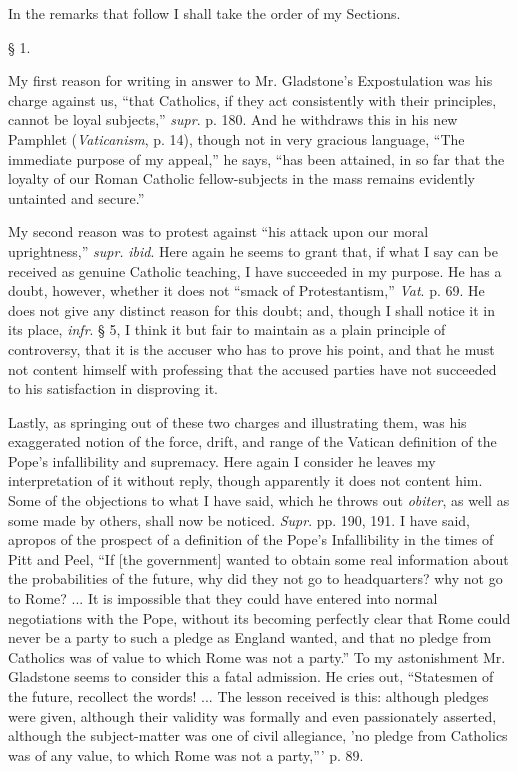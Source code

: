 In the remarks that follow I shall take the order of my Sections.

§ 1.

My first reason for writing in answer to Mr. Gladstone's
Expostulation was his charge against us, ``that Catholics, if they
act consistently with their principles, cannot be loyal subjects,'' \emph{supr}.
p. 180. And he withdraws this in his new Pamphlet (\emph{Vaticanism}, p.
14), though not in very gracious language, ``The immediate
purpose of my appeal,'' he says, ``has been attained, in so far
that the loyalty of our Roman Catholic fellow-subjects in the mass
remains evidently untainted and secure.''

My second reason was to protest against ``his attack upon our
moral uprightness,'' \emph{supr.} \emph{ibid}. Here again he seems
to grant that, if what I say can be received as genuine Catholic
teaching, I have succeeded in my purpose. He has a doubt, however,
whether it does not ``smack of Protestantism,'' \emph{Vat}. p.
69. He does not give any distinct reason for this doubt; and, though I
shall notice it in its place, \emph{infr}. § 5, I think it but fair to
maintain as a plain principle of controversy, that it is the accuser who
has to prove his point, and that he must not content himself with
professing that the accused parties have not succeeded to his
satisfaction in disproving it.

Lastly, as springing out of these two charges and illustrating them,
was his exaggerated notion of the force, drift, and range of the Vatican
definition of the Pope's infallibility and supremacy. Here again I
consider he leaves my interpretation of it without reply, though
apparently it does not content him. Some of the objections to what I
have said, which he throws out \emph{obiter}, as well as some made by
others, shall now be noticed.
\emph{Supr}. pp. 190, 191. I have said, apropos of the prospect of a
definition of the Pope's Infallibility in the times of Pitt and Peel,
``If [the government] wanted to obtain some real information about
the probabilities of the future, why did they not go to headquarters?
why not go to Rome? ... It is impossible that they could have entered into normal negotiations with the Pope, without its becoming
perfectly clear that Rome could never be a party to such a pledge as
England wanted, and that no pledge from Catholics was of value to which
Rome was not a party.'' To my astonishment Mr. Gladstone seems to
consider this a fatal admission. He cries out, ``Statesmen of the
future, recollect the words! ... The lesson received is this: although
pledges were given, although their validity was formally and even
passionately asserted, although the subject-matter was one of civil
allegiance, 'no pledge from Catholics was of any value, to which Rome
was not a party,''' p. 89.

